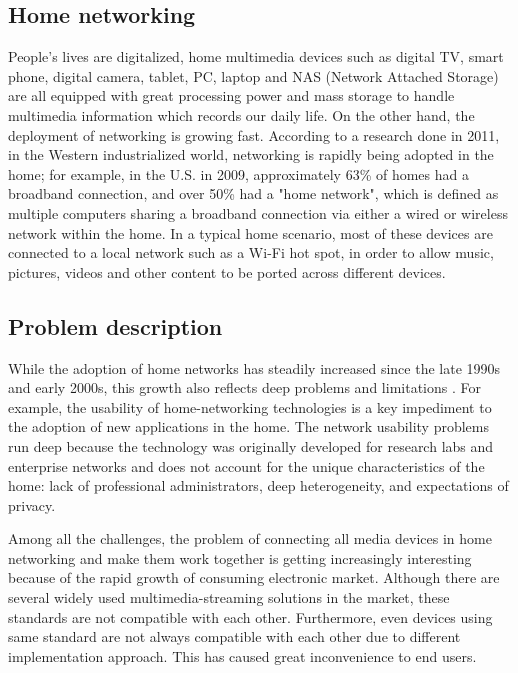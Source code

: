 
\subsection{Home networking}
People's lives are digitalized, home multimedia devices such as digital TV,
smart phone, digital camera, tablet, PC, laptop and NAS (Network Attached
Storage) are all equipped with great processing power and mass storage to
handle multimedia information which records our daily life. On the other hand,
the deployment of networking is growing fast. According to a research
\cite{stateofHN} done in 2011, in the Western industrialized world, networking
is rapidly being adopted in the home; for example, in the U.S. in 2009,
approximately 63\% of homes had a broadband connection, and over 50\% had a
"home network", which is defined as multiple computers sharing a broadband
connection via either a wired or wireless network within the home. In a typical
home scenario, most of these devices are connected to a local network such as a
Wi-Fi hot spot, in order to allow music, pictures, videos and other content to
be ported across different devices.

\subsection{Problem description}
While the adoption of home networks has steadily increased since the late 1990s
and early 2000s, this growth also reflects deep problems and limitations
\cite{stateofHN}. For example, the usability of home-networking technologies is
a key impediment to the adoption of new applications in the home. The network
usability problems run deep because the technology was originally developed for
research labs and enterprise networks and does not account for the unique
characteristics of the home: lack of professional administrators, deep
heterogeneity, and expectations of privacy.

Among all the challenges, the problem of connecting all media devices in home
networking and make them work together is getting increasingly interesting
because of the rapid growth of consuming electronic market. Although there are
several widely used multimedia-streaming solutions in the market, these
standards are not compatible with each other. Furthermore, even devices using
same standard are not always compatible with each other due to different
implementation approach. This has caused great inconvenience to end users.


